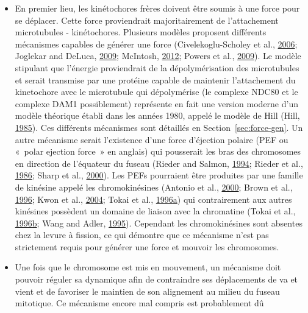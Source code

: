 \documentclass[12pt,a4paper,twoside,openright]{book}
\begin{document}
\begin{itemize}
\item
  En premier lieu, les kinétochores frères doivent être soumis à une
  force pour se déplacer. Cette force proviendrait majoritairement de
  l'attachement microtubules - kinétochores. Plusieurs modèles proposent
  différents mécanismes capables de générer une force
  (Civelekoglu-Scholey et al.,
  \protect\hyperlink{ref-Civelekoglu-Scholey2006}{2006}; Joglekar and
  DeLuca, \protect\hyperlink{ref-Joglekar2009}{2009}; McIntosh,
  \protect\hyperlink{ref-McIntosh2012}{2012}; Powers et al.,
  \protect\hyperlink{ref-Powers2009a}{2009}). Le modèle stipulant que
  l'énergie proviendrait de la dépolymérisation des microtubules et
  serait transmise par une protéine capable de maintenir l'attachement
  du kinetochore avec le microtubule qui dépolymérise (le complexe NDC80
  et le complexe DAM1 possiblement) représente en fait une version
  moderne d'un modèle théorique établi dans les années 1980, appelé le
  modèle de Hill (Hill, \protect\hyperlink{ref-Hill1985}{1985}). Ces
  différents mécanismes sont détaillés en Section~\ref{sec:force-gen}.
  Un autre mécanisme serait l'existence d'une force d'éjection polaire
  (PEF ou «~polar ejection force~» en anglais) qui pousserait les bras
  des chromosomes en direction de l'équateur du fuseau (Rieder and
  Salmon, \protect\hyperlink{ref-Rieder1994a}{1994}; Rieder et al.,
  \protect\hyperlink{ref-Rieder1986}{1986}; Sharp et al.,
  \protect\hyperlink{ref-Sharp2000}{2000}). Les PEFs pourraient être
  produites par une famille de kinésine appelé les chromokinésines
  (Antonio et al., \protect\hyperlink{ref-Antonio2000a}{2000}; Brown et
  al., \protect\hyperlink{ref-Brown1996}{1996}; Kwon et al.,
  \protect\hyperlink{ref-Kwon2004}{2004}; Tokai et al.,
  \protect\hyperlink{ref-Tokai1996a}{1996}\protect\hyperlink{ref-Tokai1996a}{a})
  qui contrairement aux autres kinésines possèdent un domaine de liaison
  avec la chromatine (Tokai et al.,
  \protect\hyperlink{ref-Tokai1996}{1996}\protect\hyperlink{ref-Tokai1996}{b};
  Wang and Adler, \protect\hyperlink{ref-Wang1995}{1995}). Cependant les
  chromokinésines sont absentes chez la levure à fission, ce qui
  démontre que ce mécanisme n'est pas strictement requis pour générer
  une force et mouvoir les chromosomes.
\item
  Une fois que le chromosome est mis en mouvement, un mécanisme doit
  pouvoir réguler sa dynamique afin de contraindre ses déplacements de
  va et vient et de favoriser le maintien de son alignement au milieu du
  fuseau mitotique. Ce mécanisme encore mal compris est probablement dû

\end{itemize}
\end{document}
